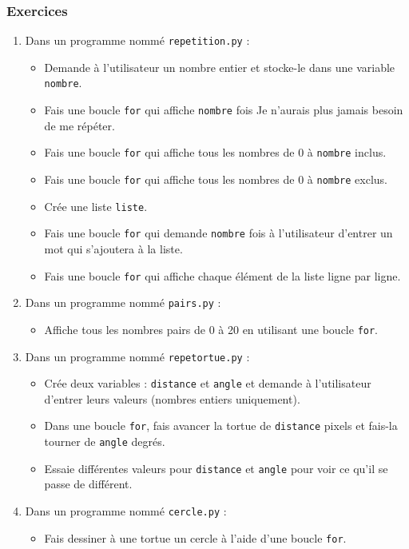 \documentclass[11pt]{article}
\begin{document}
\subsubsection*{Exercices}
\label{sec:orge8faf60}
\begin{enumerate}
\item Dans un programme nommé \texttt{repetition.py} :
\begin{itemize}
\item Demande à l'utilisateur un nombre entier et stocke-le dans une variable \texttt{nombre}.
\item Fais une boucle \texttt{for} qui affiche \texttt{nombre} fois \og Je n'aurais plus jamais besoin de me répéter\fg{}.
\item Fais une boucle \texttt{for} qui affiche tous les nombres de 0 à \texttt{nombre} inclus.
\item Fais une boucle \texttt{for} qui affiche tous les nombres de 0 à \texttt{nombre} exclus.
\item Crée une liste \texttt{liste}.
\item Fais une boucle \texttt{for} qui demande \texttt{nombre} fois à l'utilisateur d'entrer un mot qui s'ajoutera à la liste.
\item Fais une boucle \texttt{for} qui affiche chaque élément de la liste ligne par ligne.
\end{itemize}

\item Dans un programme nommé \texttt{pairs.py} :
\begin{itemize}
\item Affiche tous les nombres pairs de 0 à 20 en utilisant une boucle \texttt{for}.
\end{itemize}

\item Dans un programme nommé \texttt{repetortue.py} :
\begin{itemize}
\item Crée deux variables : \texttt{distance} et \texttt{angle} et demande à l'utilisateur d'entrer leurs valeurs (nombres entiers uniquement).
\item Dans une boucle \texttt{for}, fais avancer la tortue de \texttt{distance} pixels et fais-la tourner de \texttt{angle} degrés.
\item Essaie différentes valeurs pour \texttt{distance} et \texttt{angle} pour voir ce qu'il se passe de différent.
\end{itemize}

\item Dans un programme nommé \texttt{cercle.py} :
\begin{itemize}
\item Fais dessiner à une tortue un cercle à l'aide d'une boucle \texttt{for}.
\end{itemize}


\end{enumerate}
\end{document}
